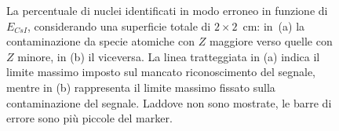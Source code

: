 \begin{figure}[!p] 
	\centering
	\hspace{10mm}
	\caption{La percentuale di nuclei identificati in modo erroneo in funzione di $E_{CsI}$, considerando una superficie totale di $2 \times 2$~cm: in~(a) la contaminazione da specie atomiche con $Z$ maggiore verso quelle con $Z$ minore, in (b) il viceversa. La linea tratteggiata in (a) indica il limite massimo imposto sul mancato riconoscimento del segnale, mentre in (b) rappresenta il limite massimo fissato sulla contaminazione del segnale. Laddove non sono mostrate, le barre di errore sono più piccole del marker.} \label{fig:leakage_res_2}
\end{figure}









